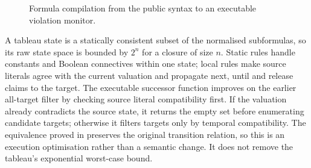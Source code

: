 \begin{figure}[ht]
  \centering
  \caption{Formula compilation from the public syntax to an executable violation monitor.}
  \label{fig:formula-pipeline}
\end{figure}

A tableau state is a statically consistent subset of the normalised
subformulas, so its raw state space is bounded by $2^n$ for a closure of size
$n$.  Static rules handle constants and Boolean connectives within one state;
local rules make source literals agree with the current valuation and propagate
next, until and release claims to the target.  The executable successor
function improves on the earlier all-target filter by checking source literal
compatibility first.  If the valuation already contradicts the source state,
it returns the empty set before enumerating candidate targets; otherwise it
filters targets only by temporal compatibility.  The equivalence proved in
 preserves the original transition relation, so this
is an execution optimisation rather than a semantic change.  It does not remove
the tableau's exponential worst-case bound.

